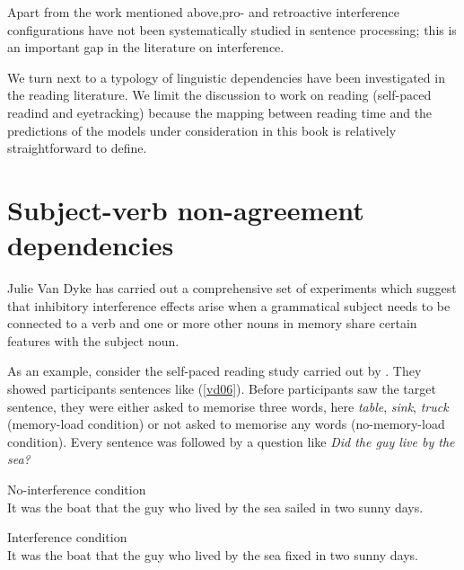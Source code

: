 \documentclass{cambridge7A}\usepackage[]{graphicx}\usepackage[]{color}
\begin{document}
 
Apart from the work mentioned above,pro- and retroactive interference configurations have not been systematically studied in sentence processing; this is an important gap in the literature on interference.  

We turn next to a typology of linguistic dependencies have been investigated in the reading literature. We limit the discussion to work on reading (self-paced readind and eyetracking) because the mapping between  reading time and the predictions of the models under consideration in this book is relatively straightforward to define.

\section{Subject-verb non-agreement dependencies}

Julie Van Dyke has carried out a comprehensive set of experiments which suggest that inhibitory interference effects arise when a grammatical subject needs to be connected to a verb and one or more other nouns in memory share certain features with the subject noun.

 As an example, consider the self-paced reading study  carried out by \cite{vandykemcelree06}.  They  showed participants sentences like (\ref{vd06}). Before  participants saw the target sentence, they were either asked to memorise three words, here \textit{table}, \textit{sink}, \textit{truck} (memory-load condition) or not asked to memorise any words (no-memory-load condition). Every sentence was followed by a question like \textit{Did the guy live by the sea?}
 
 \begin{exe}
\ex \label{vd06}
\begin{xlist}
\item No-interference condition\\
It was the boat that the guy who lived by the sea sailed in two sunny days.
\item Interference condition \\
It was the boat that the guy who lived by the sea fixed in two sunny days.
\end{xlist}
\end{exe}
\end{document}

